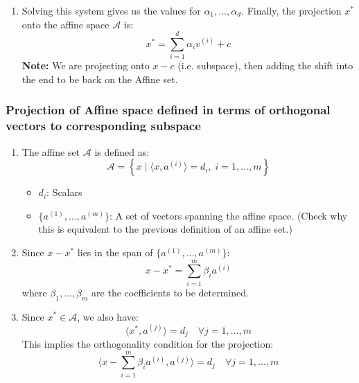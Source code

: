 \begin{derivation}
\begin{enumerate}
        \item Solving this system gives us the values for $\alpha_1, \dots, \alpha_d$. Finally, the projection $x^*$ onto the affine space $\mathcal{A}$ is:
        \[
        x^* = \sum_{i=1}^{d} \alpha_i v^{(i)} + c
        \]
        \textbf{Note:} We are projecting onto $x-c$ (i.e. subspace), then adding the shift into the end to be back on the Affine set.
    \end{enumerate}
\end{derivation}

\subsubsection{Projection of Affine space defined in terms of orthogonal vectors to corresponding subspace}
\begin{derivation}
    \begin{enumerate}
        \item The affine set $\mathcal{A}$ is defined as:
        \[
        \mathcal{A} = \left\{ x \mid \langle x, a^{(i)} \rangle = d_i, \; i = 1, \dots, m \right\}
        \]
        \begin{itemize}
            \item $d_i$: Scalars
            \item $\{a^{(1)}, \dots, a^{(m)}\}$: A set of vectors spanning the affine space. (Check why this is equivalent to the previous definition of an affine set.)
        \end{itemize}

        
        \item Since $x-x^*$ lies in the span of $\{a^{(1)}, \dots, a^{(m)}\}$:
        \[
        x - x^* = \sum_{i=1}^{m} \beta_i a^{(i)}
        \]
        where $\beta_1, \dots, \beta_m$ are the coefficients to be determined.
        
        \item Since $x^* \in \mathcal{A}$, we also have:
        \[
        \langle x^*, a^{(j)} \rangle = d_j \quad \forall j = 1, \dots, m
        \]
        This implies the orthogonality condition for the projection:
        \[
        \langle x - \sum_{i=1}^{m} \beta_i a^{(i)}, a^{(j)} \rangle = d_j \quad \forall j = 1, \dots, m
        \]
    

\end{enumerate}
\end{derivation}
